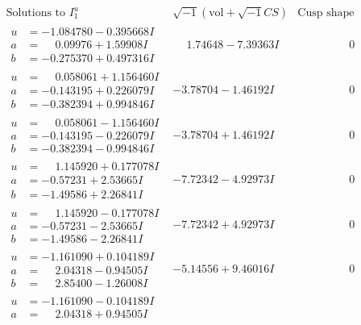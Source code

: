 \documentclass[1p]{elsarticle_modified}
\theoremstyle{definition}
\newcommand{\I}{\sqrt{-1}}
\begin{document}
$$\begin{array}{c|c|c}
\text{Solutions to }I^u_{1}& \I (\text{vol} + \sqrt{-1}CS) & \text{Cusp shape}\\
 \hline 
\begin{aligned}
u &= -1.084780 - 0.395668 I \\
a &= \phantom{-}0.09976 + 1.59908 I \\
b &= -0.275370 + 0.497316 I\end{aligned}
 & \phantom{-}1.74648 - 7.39363 I & \phantom{-0.000000 } 0 \\ \hline\begin{aligned}
u &= \phantom{-}0.058061 + 1.156460 I \\
a &= -0.143195 + 0.226079 I \\
b &= -0.382394 + 0.994846 I\end{aligned}
 & -3.78704 - 1.46192 I & \phantom{-0.000000 } 0 \\ \hline\begin{aligned}
u &= \phantom{-}0.058061 - 1.156460 I \\
a &= -0.143195 - 0.226079 I \\
b &= -0.382394 - 0.994846 I\end{aligned}
 & -3.78704 + 1.46192 I & \phantom{-0.000000 } 0 \\ \hline\begin{aligned}
u &= \phantom{-}1.145920 + 0.177078 I \\
a &= -0.57231 + 2.53665 I \\
b &= -1.49586 + 2.26841 I\end{aligned}
 & -7.72342 - 4.92973 I & \phantom{-0.000000 } 0 \\ \hline\begin{aligned}
u &= \phantom{-}1.145920 - 0.177078 I \\
a &= -0.57231 - 2.53665 I \\
b &= -1.49586 - 2.26841 I\end{aligned}
 & -7.72342 + 4.92973 I & \phantom{-0.000000 } 0 \\ \hline\begin{aligned}
u &= -1.161090 + 0.104189 I \\
a &= \phantom{-}2.04318 - 0.94505 I \\
b &= \phantom{-}2.85400 - 1.26008 I\end{aligned}
 & -5.14556 + 9.46016 I & \phantom{-0.000000 } 0 \\ \hline\begin{aligned}
u &= -1.161090 - 0.104189 I \\
a &= \phantom{-}2.04318 + 0.94505 I \\

\end{aligned}
\end{array}$$
\end{document}
